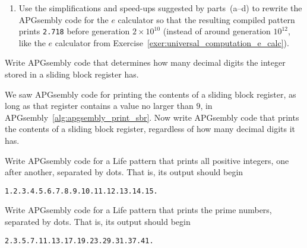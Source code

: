 \begin{multicols}{2}
\begin{problem}
\begin{enumerate}[label=\bf\color{ocre}(\alph*)]
		\item Use the simplifications and speed-ups suggested by parts~(a--d) to rewrite the APGsembly code for the $e$ calculator so that the resulting compiled pattern prints \texttt{2.718} before generation $2\times 10^{10}$ (instead of around generation $10^{12}$, like the $e$ calculator from Exercise~\ref{exer:universal_computation_e_calc}).
	\end{enumerate}
\end{problem}


\mfilbreak


\begin{problem}\label{exer:universal_computation_determine_digits}
	Write APGsembly code that determines how many decimal digits the integer stored in a sliding block register has.
\end{problem}


\mfilbreak


\begin{problem}\label{exer:universal_computation_print_register}
	We saw APGsembly code for printing the contents of a sliding block register, as long as that register contains a value no larger than $9$, in APGsembly~\ref{alg:apgsembly_print_sbr}. Now write APGsembly code that prints the contents of a sliding block register, regardless of how many decimal digits it has.
	
\end{problem}


\mfilbreak


\begin{problem}\label{exer:universal_computation_print_integers}
	Write APGsembly code for a Life pattern that prints all positive integers, one after another, separated by dots. That is, its output should begin
	\begin{center}
		\texttt{1.2.3.4.5.6.7.8.9.10.11.12.13.14.15.}
	\end{center}
	
\end{problem}


\mfilbreak


\begin{problem}\label{exer:universal_computation_print_prime}
	Write APGsembly code for a Life pattern that prints the prime numbers, separated by dots. That is, its output should begin
	\begin{center}
		\texttt{2.3.5.7.11.13.17.19.23.29.31.37.41.}
	\end{center}
	

\end{problem}
\end{multicols}
